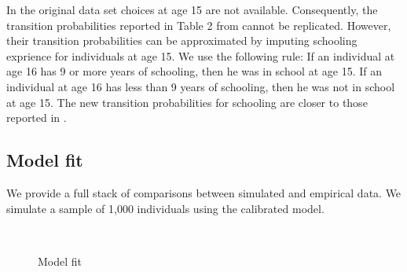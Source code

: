 In the original data set choices at age 15 are not available. Consequently, the transition probabilities reported in Table 2 from \citet{Keane.1997} cannot be replicated. However, their transition probabilities can be approximated by imputing schooling exprience for individuals at age 15. We use the following rule: If an individual at age 16 has 9 or more years of schooling, then he was in school at age 15. If an individual at age 16 has less than 9 years of schooling, then he was not in school at age 15. The new transition probabilities for schooling are closer to those reported in \citet{Keane.1997}.



\newpage
\subsection{Model fit}

We provide a full stack of comparisons between simulated and empirical data. We simulate a sample of 1,000 individuals using the calibrated model.



\begin{figure}[h]\centering
	\caption{Model fit}\label{Model fit appendix}
	\hspace{0.3cm}
	 \\
	\hspace{0.3cm}
\end{figure}
